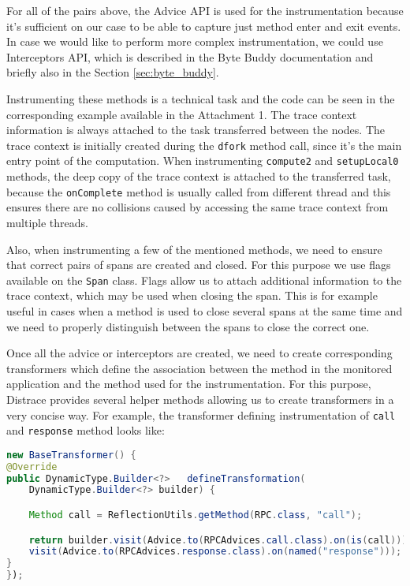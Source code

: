 For all of the pairs above, the Advice API is used for the instrumentation because it's sufficient on our case to be able to capture just method enter and exit events. In case we would like to perform more complex instrumentation, we could use Interceptors API, which is described in the Byte Buddy documentation and briefly also in the Section \ref{sec:byte_buddy}.

Instrumenting these methods is a technical task and the code can be seen in the corresponding example available in the Attachment 1. The trace context information is always attached to the task transferred between the nodes. The trace context is initially created during the \texttt{dfork} method call, since it's the main entry point of the computation. When instrumenting \texttt{compute2} and \texttt{setupLocal0} methods, the deep copy of the trace context is attached to the transferred task, because the \texttt{onComplete} method is usually called from different thread and this ensures there are no collisions caused by accessing the same trace context from multiple threads.

Also, when instrumenting a few of the mentioned methods, we need to ensure that correct pairs of spans are created and closed. For this purpose we use flags available on the \texttt{Span} class. Flags allow us to attach additional information to the trace context, which may be used when closing the span. This is for example useful in cases when a method is used to close several spans at the same time and we need to properly distinguish between the spans to close the correct one.

Once all the advice or interceptors are created, we need to create corresponding transformers which define the association between the method in the monitored application and the method used for the instrumentation. For this purpose, Distrace provides several helper methods allowing us to create transformers in a very concise way. For example, the transformer defining instrumentation of \texttt{call} and \texttt{response} method looks like:

\begin{lstlisting}[language=Java]
new BaseTransformer() {
@Override
public DynamicType.Builder<?> 	defineTransformation(
	DynamicType.Builder<?> builder) {

	Method call = ReflectionUtils.getMethod(RPC.class, "call");

	return builder.visit(Advice.to(RPCAdvices.call.class).on(is(call))).
	visit(Advice.to(RPCAdvices.response.class).on(named("response")));
}
});
\end{lstlisting}


